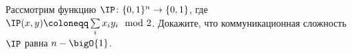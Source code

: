 Рассмотрим функцию $\IP\colon \{0, 1\}^n \to \{0, 1\}$, где $\IP(x, y) \coloneqq \sum\limits_{i} x_{i}y_{i} \mod 2$.
Докажите, что коммуникационная сложность $\IP$ равна $n - \bigO{1}$.
